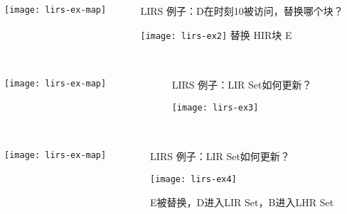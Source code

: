 \begin{frame}[plain]
	\frametitle{ }
	\begin{columns}
		\begin{column}{.4\textwidth}
			\centering
			\texttt{[image: lirs-ex-map]}
		\end{column}
		
		\begin{column}{.6\textwidth}
			LIRS 例子：D在时刻10被访问，替换哪个块？
			
			\texttt{[image: lirs-ex2]}
			\pause
			\centering
			替换 HIR块 E	
		\end{column}
		
		
	\end{columns}
\end{frame}




\begin{frame}[plain]
	\frametitle{ }
	\begin{columns}
		\begin{column}{.4\textwidth}
			\centering
			\texttt{[image: lirs-ex-map]}
		\end{column}
		
		\begin{column}{.6\textwidth}
			LIRS 例子：LIR Set如何更新？
			
			\texttt{[image: lirs-ex3]}
			

		\end{column}
		
		
	\end{columns}
\end{frame}


\begin{frame}[plain]
	\frametitle{ }
	\begin{columns}
		\begin{column}{.4\textwidth}
			\centering
			\texttt{[image: lirs-ex-map]}
		\end{column}
		
		\begin{column}{.6\textwidth}
			LIRS 例子：LIR Set如何更新？
			
			\texttt{[image: lirs-ex4]}
			
			E被替换，D进入LIR Set，B进入LHR Set 
		\end{column}
		
		
	\end{columns}
\end{frame}



